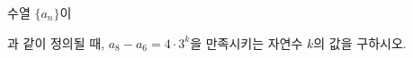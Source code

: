 수열 $\{a_n\}$이\par\smallskip{}\par\smallskip\noindent 과 같이 정의될 때, $a_8-a_6=4\cdot3^{k}$을 만족시키는 자연수 $k$의 값을 구하시오.
